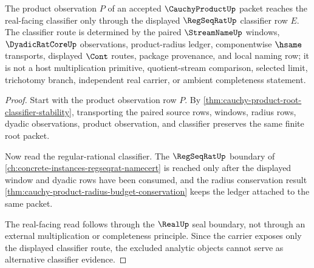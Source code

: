 \begin{theorem}
\label{thm:cauchy-product-real-classifier-obligation}
The product observation $P$ of an accepted $\CauchyProductUp$ packet reaches the real-facing classifier only through the displayed $\RegSeqRatUp$ classifier row $E$. The classifier route is determined by the paired $\StreamNameUp$ windows, $\DyadicRatCoreUp$ observations, product-radius ledger, componentwise $\hsame$ transports, displayed $\Cont$ routes, package provenance, and local naming row; it is not a host multiplication primitive, quotient-stream comparison, selected limit, trichotomy branch, independent real carrier, or ambient completeness statement.
\end{theorem}
\begin{proof}
Start with the product observation row $P$. By \autoref{thm:cauchy-product-root-classifier-stability}, transporting the paired source rows, windows, radius rows, dyadic observations, product observation, and classifier preserves the same finite root packet.

Now read the regular-rational classifier. The $\RegSeqRatUp$ boundary of \autoref{ch:concrete-instances-regseqrat-namecert} is reached only after the displayed window and dyadic rows have been consumed, and the radius conservation result \autoref{thm:cauchy-product-radius-budget-conservation} keeps the ledger attached to the same packet.

The real-facing read follows through the $\RealUp$ seal boundary, not through an external multiplication or completeness principle. Since the carrier exposes only the displayed classifier route, the excluded analytic objects cannot serve as alternative classifier evidence.
\end{proof}

